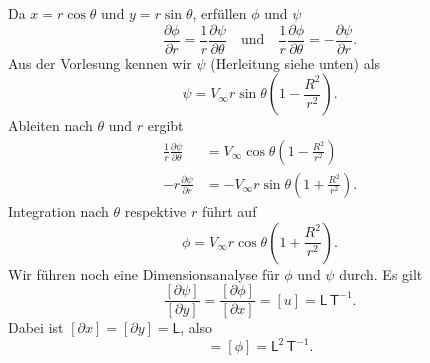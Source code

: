 \documentclass[12pt]{exam}
\newcommand{\del}{\partial}
\begin{document}
\begin{questions}
    \begin{solution}
        Da $x = r \cos \theta$ und $y = r \sin \theta$, erfüllen $\phi$ und $\psi$
        \begin{equation*}
            \frac{\del \phi}{\del r} = \frac{1}{r} \frac{\del \psi}{ \del \theta} \quad \text{und} \quad \frac{1}{r} \frac{\del \phi}{\del \theta} = -\frac{\del \psi}{\del r}.
        \end{equation*}
        Aus der Vorlesung kennen wir $\psi$ (Herleitung siehe unten) als
        \begin{equation*}
            \psi = V_{\infty} r \sin \theta \left( 1 - \frac{R^2}{r^2} \right).
        \end{equation*}
        Ableiten nach $\theta$ und $r$ ergibt
        \begin{align*}
            \frac{1}{r} \frac{\del \psi}{\del \theta} &=  V_{\infty} \cos \theta \left( 1 - \frac{R^2}{r^2} \right) \\
            -r \frac{\del \psi}{\del r} &= -V_{\infty} r \sin \theta \left( 1 + \frac{R^2}{r^2} \right).
        \end{align*}
        Integration nach $\theta$ respektive $r$ führt auf
        \begin{equation*}
            \phi = V_{\infty} r \cos \theta \left( 1 + \frac{R^2}{r^2} \right).
        \end{equation*}
        Wir führen noch eine Dimensionsanalyse für $\phi$ und $\psi$ durch. Es gilt
        \begin{equation*}
            \frac{[\del \psi]}{[\del y]} = \frac{[\del \phi]}{[\del x]} = [u] = \mathsf{L} \, \mathsf{T}^{-1}.
        \end{equation*}
        Dabei ist $[\del x] = [\del y] = \mathsf{L}$, also
        \begin{equation*}
            [\psi] = [\phi] = \mathsf{L}^2 \, \mathsf{T}^{-1}.
        \end{equation*}
        

\end{solution}
\end{questions}
\end{document}
